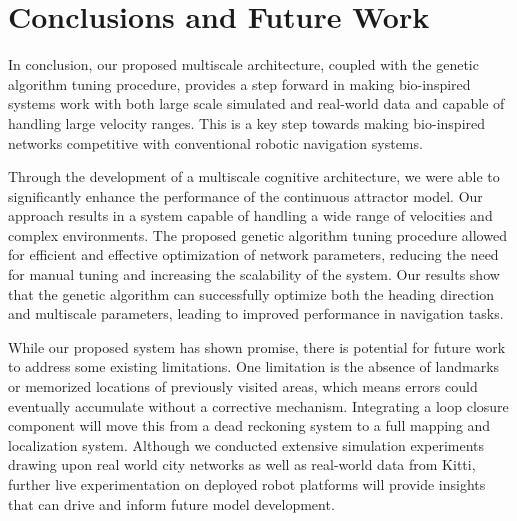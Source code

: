 
\section{Conclusions and Future Work}
\label{sec:conclusion}
In conclusion, our proposed multiscale architecture, coupled with the genetic algorithm tuning procedure, provides a step forward in making bio-inspired systems work with both large scale simulated and real-world data and capable of handling large velocity ranges. This is a key step towards making bio-inspired networks competitive with conventional robotic navigation systems.

Through the development of a multiscale cognitive architecture, we were able to significantly enhance the performance of the continuous attractor model. Our approach results in a system capable of handling a wide range of velocities and complex environments. The proposed genetic algorithm tuning procedure allowed for efficient and effective optimization of network parameters, reducing the need for manual tuning and increasing the scalability of the system. Our results show that the genetic algorithm can successfully optimize both the heading direction and multiscale parameters, leading to improved performance in navigation tasks.

While our proposed system has shown promise, there is potential for future work to address some existing limitations. One limitation is the absence of landmarks or memorized locations of previously visited areas, which means errors could eventually accumulate without a corrective mechanism. Integrating a loop closure component will move this from a dead reckoning system to a full mapping and localization system. Although we conducted extensive simulation experiments drawing upon real world city networks as well as real-world data from Kitti, further live experimentation on deployed robot platforms will provide insights that can drive and inform future model development.

